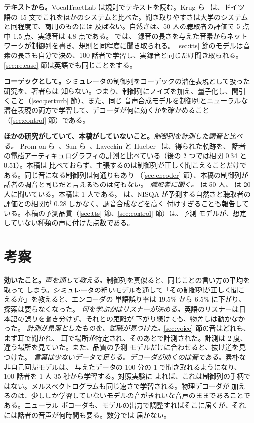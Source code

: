 \documentclass[10pt,a4paper,twocolumn]{article}
\begin{document}
\textbf{テキストから。}VocalTractLab は規則でテキストを読む。Krug ら~\cite{vtltts} は、ドイツ語の
15 文でこれをほかのシステムと比べた。聞き取りやすさは大学のシステムと同程度で、商用のものには
及ばない。自然さは、50 人の聴取者の評価で 5 点中 1.5 点、実録音は 4.8 点である。\cite{krug} では、
録音の長さを与えた音素からネットワークが制御列を書き、規則と同程度に聞き取られる。
\ref{sec:tts} 節のモデルは音素の長さも自分で決め、100 話者で学習し、実録音と同じだけ聞き取られる。
\ref{sec:release} 節は英語でも同じことをする。

\textbf{コーデックとして。}シミュレータの制御列をコーデックの潜在表現として扱った研究を、著者らは
知らない。つまり、制御列にノイズを加え、量子化し、間引くこと（\ref{sec:perturb} 節）、また、同じ
音声合成モデルを制御列とニューラルな潜在表現の両方で学習して、デコーダが何に効くかを確かめること
（\ref{sec:control} 節）である。

\textbf{ほかの研究がしていて、本稿がしていないこと。}\emph{制御列を計測した調音と比べる。}
Prom-on ら~\cite{promon}、Sun ら~\cite{sun}、Lavechin と Hueber~\cite{lavechin} は、得られた軌跡を、
話者の電磁アーティキュログラフィの計測と比べている（後の 2 つでは相関 0.34 と 0.51）。本稿は
比べておらず、主張するのは制御列が正しく聞こえることだけである。同じ音になる制御列は何通りもあり
（\ref{sec:encoder} 節）、本稿の制御列が話者の調音と同じだと言えるものは何もない。
\emph{聴取者に聞く。}\cite{vtltts} は 50 人、\cite{georges} は 20 人に聞いている。本稿は 1 人である。
\cite{vtltts} は、NISQA が予測する自然さと聴取者の評価との相関が 0.28 しかなく、調音合成などを高く
付けすぎることも報告している。本稿の予測品質（\ref{sec:tts} 節、\ref{sec:control} 節）は、予測
モデルが、想定していない種類の声に付けた点数である。

\section{考察}\label{sec:discussion}
\textbf{効いたこと。}\emph{声を通して教える。}制御列を真似ると、同じことの言い方の平均を取って
しまう。シミュレータの粗いモデルを通して「その制御列が正しく聞こえるか」を教えると、エンコーダの
単語誤り率は 19.5\% から 6.5\% に下がり、探索は要らなくなった。
\emph{何を学ぶかはリスナーが決める。}英語のリスナーは日本語の誤りを聞き分けず、それとの距離が
下がり続けても、物差しは動かなかった。
\emph{計測が見落としたものを、試聴が見つけた。}\ref{sec:voice} 節の音はどれも、まず耳で聞かれ、
耳で場所が特定され、そのあとで計測された。計測は 2 度、違う場所を見ていた。また、品質の予測
モデルだけに合わせると、抜け道を見つけた。
\emph{言葉は少ないデータで足りる。デコーダが効くのは音である。}素朴な非自己回帰モデルは、
与えたデータの 100 分の 1 で聞き取れるようになり、100 話者を 1 人 35 秒から学習する。対照実験に
よれば、これは制御列の手柄ではない。メルスペクトログラムも同じ速さで学習される。物理デコーダが
加えるのは、少ししか学習していないモデルの音がきれいな音声のままであることである。ニューラル
ボコーダも、モデルの出力で調整すればそこに届くが、それには話者の音声が何時間も要る。数分では
届かない。
\end{document}
